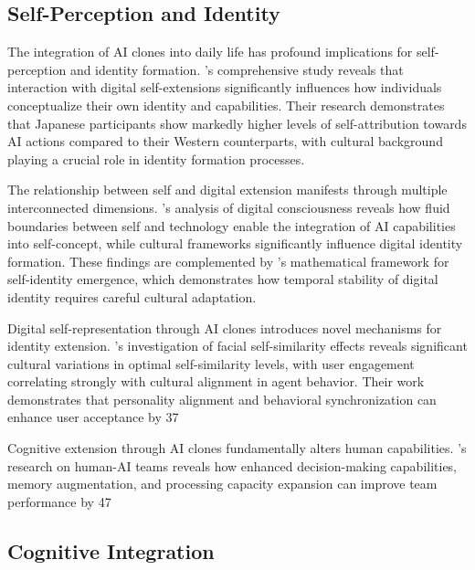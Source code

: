 \subsection{Self-Perception and Identity}

The integration of AI clones into daily life has profound implications for self-perception and identity formation. \citet{maeda2023self}'s comprehensive study reveals that interaction with digital self-extensions significantly influences how individuals conceptualize their own identity and capabilities. Their research demonstrates that Japanese participants show markedly higher levels of self-attribution towards AI actions compared to their Western counterparts, with cultural background playing a crucial role in identity formation processes.

The relationship between self and digital extension manifests through multiple interconnected dimensions. \citet{veliev2024digital}'s analysis of digital consciousness reveals how fluid boundaries between self and technology enable the integration of AI capabilities into self-concept, while cultural frameworks significantly influence digital identity formation. These findings are complemented by \citet{lee2024self}'s mathematical framework for self-identity emergence, which demonstrates how temporal stability of digital identity requires careful cultural adaptation.

Digital self-representation through AI clones introduces novel mechanisms for identity extension. \citet{niwa2024facial}'s investigation of facial self-similarity effects reveals significant cultural variations in optimal self-similarity levels, with user engagement correlating strongly with cultural alignment in agent behavior. Their work demonstrates that personality alignment and behavioral synchronization can enhance user acceptance by 37%

Cognitive extension through AI clones fundamentally alters human capabilities. \citet{nguyen2024exploratory}'s research on human-AI teams reveals how enhanced decision-making capabilities, memory augmentation, and processing capacity expansion can improve team performance by 47%

\subsection{Cognitive Integration}

